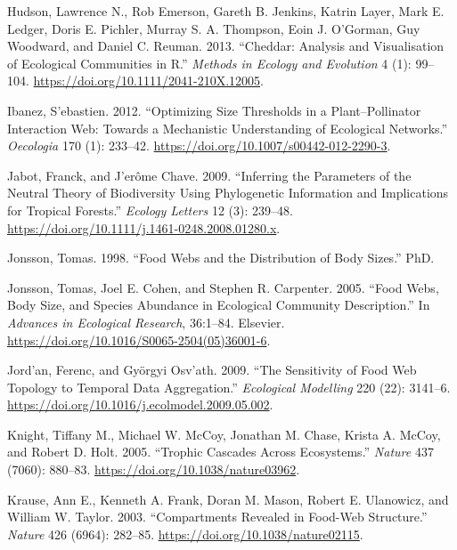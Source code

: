\documentclass{article}
\begin{document}
\leavevmode\hypertarget{ref-hudsonCheddarAnalysisVisualisation2013}{}%
Hudson, Lawrence N., Rob Emerson, Gareth B. Jenkins, Katrin Layer, Mark
E. Ledger, Doris E. Pichler, Murray S. A. Thompson, Eoin J. O'Gorman,
Guy Woodward, and Daniel C. Reuman. 2013. ``Cheddar: Analysis and
Visualisation of Ecological Communities in R.'' \emph{Methods in Ecology
and Evolution} 4 (1): 99--104.
\url{https://doi.org/10.1111/2041-210X.12005}.

\leavevmode\hypertarget{ref-ibanezOptimizingSizeThresholds2012}{}%
Ibanez, S\a'ebastien. 2012. ``Optimizing Size Thresholds in a
Plant--Pollinator Interaction Web: Towards a Mechanistic Understanding
of Ecological Networks.'' \emph{Oecologia} 170 (1): 233--42.
\url{https://doi.org/10.1007/s00442-012-2290-3}.

\leavevmode\hypertarget{ref-jabotInferringParametersNeutral2009}{}%
Jabot, Franck, and J\a'erôme Chave. 2009. ``Inferring the Parameters of
the Neutral Theory of Biodiversity Using Phylogenetic Information and
Implications for Tropical Forests.'' \emph{Ecology Letters} 12 (3):
239--48. \url{https://doi.org/10.1111/j.1461-0248.2008.01280.x}.

\leavevmode\hypertarget{ref-JonssonPhD}{}%
Jonsson, Tomas. 1998. ``Food Webs and the Distribution of Body Sizes.''
PhD.

\leavevmode\hypertarget{ref-jonssonFoodWebsBody2005}{}%
Jonsson, Tomas, Joel E. Cohen, and Stephen R. Carpenter. 2005. ``Food
Webs, Body Size, and Species Abundance in Ecological Community
Description.'' In \emph{Advances in Ecological Research}, 36:1--84.
Elsevier. \url{https://doi.org/10.1016/S0065-2504(05)36001-6}.

\leavevmode\hypertarget{ref-jordanSensitivityFoodWeb2009}{}%
Jord\a'an, Ferenc, and Györgyi Osv\a'ath. 2009. ``The Sensitivity of
Food Web Topology to Temporal Data Aggregation.'' \emph{Ecological
Modelling} 220 (22): 3141--6.
\url{https://doi.org/10.1016/j.ecolmodel.2009.05.002}.

\leavevmode\hypertarget{ref-knightTrophicCascadesEcosystems2005}{}%
Knight, Tiffany M., Michael W. McCoy, Jonathan M. Chase, Krista A.
McCoy, and Robert D. Holt. 2005. ``Trophic Cascades Across Ecosystems.''
\emph{Nature} 437 (7060): 880--83.
\url{https://doi.org/10.1038/nature03962}.

\leavevmode\hypertarget{ref-krauseCompartmentsRevealedFoodweb2003}{}%
Krause, Ann E., Kenneth A. Frank, Doran M. Mason, Robert E. Ulanowicz,
and William W. Taylor. 2003. ``Compartments Revealed in Food-Web
Structure.'' \emph{Nature} 426 (6964): 282--85.
\url{https://doi.org/10.1038/nature02115}.
\end{document}

